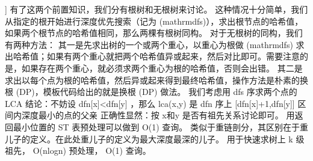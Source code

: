 {}]\markdownRendererParagraphSeparator
{}有了这两个前置知识，我们分有根树和无根树来讨论。\markdownRendererParagraphSeparator
{} 这种情况十分简单，我们从指定的根开始进行深度优先搜索（记为 (\markdownRendererBackslash{}mathrm\markdownRendererLeftBrace{}dfs\markdownRendererRightBrace{})），求出根节点的哈希值，如果两个根节点的哈希值相同，那么两棵有根树同构。\markdownRendererParagraphSeparator
{} 对于无根树的同构，我们有两种方法：\markdownRendererParagraphSeparator
{}其一是先求出树的一个或两个重心，以重心为根做 (\markdownRendererBackslash{}mathrm\markdownRendererLeftBrace{}dfs\markdownRendererRightBrace{}) 求出哈希值；如果有两个重心就把两个哈希值异或起来，然后对比即可。需要注意的是，如果存在两个重心，就必须求两个重心为根的哈希值，否则会出错。\markdownRendererHardLineBreak
{}其二是求出以每个点为根的哈希值，然后异或起来得到最终哈希值，操作方法是朴素的换根 (DP)，模板代码给出的就是换根 (DP) 做法。\markdownRendererInterblockSeparator
{}\markdownRendererInterblockSeparator
{}
\markdownRendererSectionEnd \markdownRendererSectionBegin
{}\markdownRendererInterblockSeparator
{}我们考虑用\markdownRendererDollarSign{} dfs \markdownRendererDollarSign{}序求两个点的\markdownRendererDollarSign{} LCA \markdownRendererDollarSign{}\markdownRendererParagraphSeparator
{}结论：不妨设\markdownRendererDollarSign{} dfn[x]<dfn[y] \markdownRendererDollarSign{}，那么\markdownRendererDollarSign{} lca(x,y) \markdownRendererDollarSign{}是\markdownRendererDollarSign{} dfn \markdownRendererDollarSign{}序上\markdownRendererDollarSign{} [dfn[x]+1,dfn[y]] \markdownRendererDollarSign{}区间内深度最小的点的父亲\markdownRendererParagraphSeparator
{}正确性显然：按\markdownRendererDollarSign{} x和y \markdownRendererDollarSign{}是否有祖先关系讨论即可。\markdownRendererParagraphSeparator
{}用返回最小位置的\markdownRendererDollarSign{} ST \markdownRendererDollarSign{}表预处理可以做到\markdownRendererDollarSign{} O(1) \markdownRendererDollarSign{}查询。\markdownRendererInterblockSeparator
{}\markdownRendererInterblockSeparator
{}
\markdownRendererSectionEnd \markdownRendererSectionBegin
{}\markdownRendererInterblockSeparator
{}类似于重链剖分，其区别在于重儿子的定义。在此处重儿子的定义为最大深度最深的儿子。\markdownRendererParagraphSeparator
{}用于快速求树上\markdownRendererDollarSign{} k \markdownRendererDollarSign{}级祖先，\markdownRendererDollarSign{} O(nlogn) \markdownRendererDollarSign{}预处理，\markdownRendererDollarSign{} O(1) \markdownRendererDollarSign{}查询。\markdownRendererInterblockSeparator
